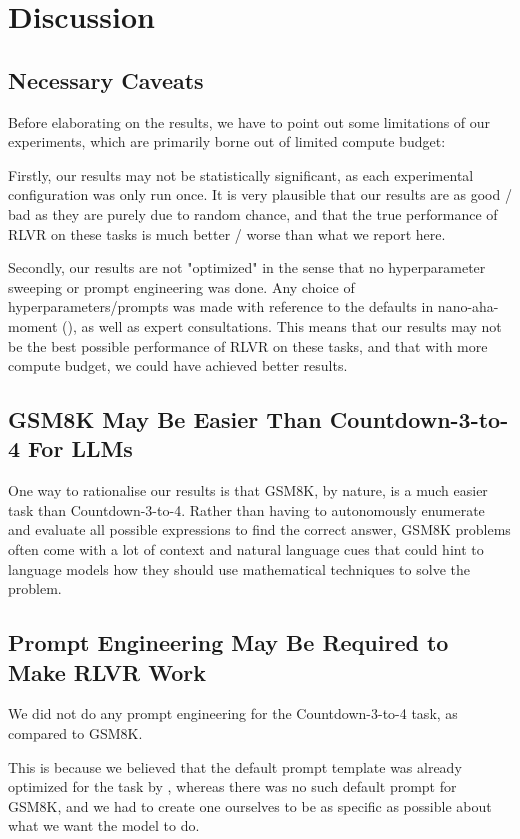 \documentclass{article} %
\theoremstyle{definition}
\begin{document}
\section{Discussion}
\subsection{Necessary Caveats}
Before elaborating on the results, we have to point out some limitations of our experiments,
which are primarily borne out of limited compute budget:

Firstly, our results may not be statistically significant, as each experimental configuration
was only run once. It is very plausible that our results are as good / bad as they are purely due to 
random chance, and that the true performance of RLVR on these tasks is much better / worse than what we report here.

Secondly, our results are not "optimized" in the sense that no hyperparameter sweeping
or prompt engineering was done.
Any choice of hyperparameters/prompts was made with reference to the defaults in nano-aha-moment 
(\cite{nano-aha-moment}), as well as expert consultations.
This means that our results may not be the best possible performance of RLVR on these tasks,
and that with more compute budget, we could have achieved better results.

\subsection{GSM8K May Be Easier Than Countdown-3-to-4 For LLMs}
One way to rationalise our results is that GSM8K, by nature, is a much easier task than 
Countdown-3-to-4. Rather than having to autonomously enumerate and evaluate all possible expressions
to find the correct answer, GSM8K problems often come with a lot of context and 
natural language cues that could hint to language models how they should use
mathematical techniques to solve the problem.

\subsection{Prompt Engineering May Be Required to Make RLVR Work}

We did not do any prompt engineering for the Countdown-3-to-4 task, as compared to GSM8K.

This is because we believed that the default prompt template was already optimized for the task by \cite{nano-aha-moment},
whereas there was no such default prompt for GSM8K, and we had to create one ourselves
to be as specific as possible about what we want the model to do.
\end{document}
